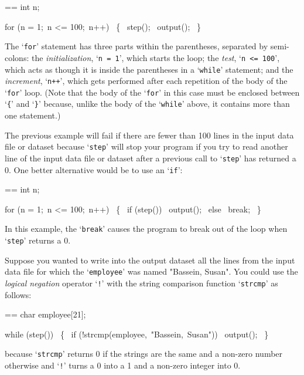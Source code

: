 \documentclass{book}
\makeatletter
\newenvironment{Texinfopreformatted}{%
  \par\GNUTobeylines\obeyspaces\frenchspacing\parskip=\z@\parindent=\z@}{}
{\catcode`\^^M=13 \gdef\GNUTobeylines{\catcode`\^^M=13 \def^^M{\null\par}}}
\newenvironment{Texinfoindented}{\begin{list}{}{}\item\relax}{\end{list}}
\renewcommand{\_}{\Texinfounderscore\discretionary{}{}{}}
\makeatother
\begin{document}
\begin{Texinfoindented}
\begin{Texinfopreformatted}%
\ttfamily int n;

for (n = 1;\ n <= 100;\ n++)
\  \{
\    step();
\    output();
\  \}
\end{Texinfopreformatted}
\end{Texinfoindented}
\noindent{}The `\texttt{for}' statement has three parts within the parentheses, separated by semi-colons:
the \textsl{initialization}, `\texttt{n = 1}', which starts the loop; the
\textsl{test}, `\texttt{n <= 100}', which acts as though it is inside the parentheses
in a `\texttt{while}' statement; and the \textsl{increment}, `\texttt{n++}', which gets
performed after each repetition of the body of the `\texttt{for}' loop.
(Note that the body of the `\texttt{for}' in this case must be enclosed between
`\texttt{\{}' and `\texttt{\}}' because, unlike the body of the `\texttt{while}' above, it
contains more than one statement.)

The previous example will fail if there are fewer than 100 lines in the input
data file or dataset because `\texttt{step}' will stop your program if you try
to read another line of the input data file or dataset
after a previous call to `\texttt{step}' has returned a 0.
One better alternative would be to use an
`\texttt{if}':

\begin{Texinfoindented}
\begin{Texinfopreformatted}%
\ttfamily int n;

for (n = 1;\ n <= 100;\ n++)
\  \{
\    if (step())
\      output();
\    else
\      break;
\  \}
\end{Texinfopreformatted}
\end{Texinfoindented}
\noindent{}In this example, the `\texttt{break}' causes the program to break out of the loop
when `\texttt{step}' returns a 0.

Suppose you wanted to write into the output dataset
all the lines from the input data file
for which the `\texttt{employee}' was named "Bassein, Susan".
You could use the
\textsl{logical negation} operator `\texttt{!}' with the string comparison function
`\texttt{strcmp}'
%
%
%
as follows:

\begin{Texinfoindented}
\begin{Texinfopreformatted}%
\ttfamily char employee[21];

while (step())
\  \{
\    if (!strcmp(employee,\ "Bassein,\ Susan"))
\      output();
\  \}
\end{Texinfopreformatted}
\end{Texinfoindented}
\noindent{}because `\texttt{strcmp}' returns 0 if the strings are the
same and a non-zero number otherwise and `\texttt{!}' turns a 0 into a 1
and a non-zero integer into 0.
\end{document}
